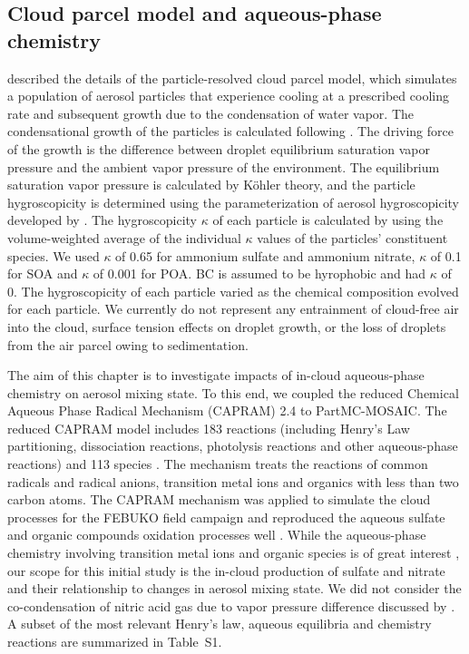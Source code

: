 \documentclass[edeposit,fullpage]{uiucthesis2009}
\begin{document}
\subsection{Cloud parcel model and aqueous-phase chemistry}
\citet{ching2012impacts} described the details of the particle-resolved cloud
parcel model, which simulates a population of aerosol particles that
experience cooling at a prescribed cooling rate and subsequent growth
due to the condensation of water vapor. The condensational growth of
the particles is calculated following \citet{Seinfeld2016}. The
driving force of the growth is the difference between droplet
equilibrium saturation vapor pressure and the ambient vapor pressure
of the environment. The equilibrium saturation vapor pressure is
calculated by K\"ohler theory, and the particle hygroscopicity is
determined using the parameterization of aerosol hygroscopicity
developed by \citet{Petters2007}. The hygroscopicity $\kappa$
  of each particle is calculated by using the volume-weighted average
  of the individual $\kappa$ values of the particles' constituent
  species. We used $\kappa$ of 0.65 for ammonium sulfate and ammonium nitrate,
  $\kappa$ of 0.1 for SOA and $\kappa$ of 0.001 for POA.  BC is
  assumed to be hyrophobic and had $\kappa$ of 0.  The hygroscopicity
  of each particle varied as the chemical composition evolved for each
  particle. We currently do not represent any entrainment of
cloud-free air into the cloud, surface tension effects on droplet
growth, or the loss of droplets from the air parcel owing to
sedimentation.

The aim of this chapter is to investigate impacts of in-cloud
aqueous-phase chemistry on aerosol mixing state. To this end, we
coupled the reduced Chemical Aqueous Phase Radical Mechanism (CAPRAM)
2.4 to PartMC-MOSAIC. The reduced CAPRAM model includes 183 reactions
(including Henry's Law partitioning, dissociation reactions,
photolysis reactions and other aqueous-phase reactions) and 113
species \citep{Herrmann1999, ervens2003capram}. The mechanism
treats the reactions of common radicals and radical anions, transition
metal ions and organics with less than two carbon atoms. The CAPRAM
mechanism was applied to simulate the cloud processes for the FEBUKO
field campaign and reproduced the aqueous sulfate and organic
compounds oxidation processes well \citep{Tilgner2005, Wolke2005}.
While the aqueous-phase chemistry involving transition metal ions and
organic species is of great interest
\citep{Mayol-Bracero2002,Harris2013a, Alexander2009, Lian2019,
    McNeill2015a, Smith2014, wonaschuetz2012aerosol,wagner2015situ},
our scope for this initial study is the in-cloud production of
  sulfate and nitrate and their relationship to changes in aerosol
  mixing state. We did not consider the co-condensation of nitric acid
  gas due to vapor pressure difference discussed by
  \citet{crooks2018parameterisation}. A subset of the most relevant
Henry's law, aqueous equilibria and chemistry reactions are summarized
in Table~S1.
\end{document}
